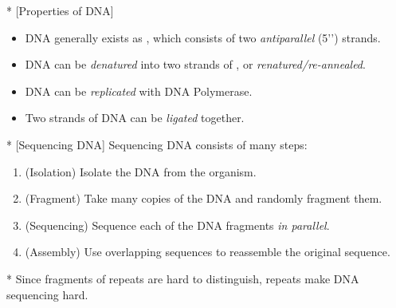 \begin{fact}*
	[Properties of DNA]
	\begin{itemize}
		\item DNA generally exists as , which consists of two \emph{antiparallel} (5'') strands.
		\item DNA can be \emph{denatured} into two strands of , or \emph{renatured/re-annealed}.
		\item DNA can be \emph{replicated} with DNA Polymerase.
		\item Two strands of DNA can be \emph{ligated} together.
	\end{itemize}
\end{fact}

\begin{fact}*
	[Sequencing DNA]
	Sequencing DNA consists of many steps:
	\begin{enumerate}
		\item (Isolation) Isolate the DNA from the organism.
		\item (Fragment) Take many copies of the DNA and randomly fragment them.
		\item (Sequencing) Sequence each of the DNA fragments \emph{in parallel}.
		\item (Assembly) Use overlapping sequences to reassemble the original sequence.  
	\end{enumerate}	
\end{fact}

\begin{cor}*
	Since fragments of repeats are hard to distinguish, repeats make DNA sequencing hard.
\end{cor}
